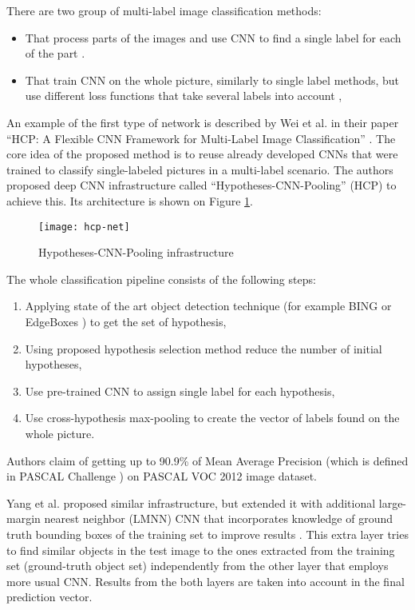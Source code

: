 There are two group of multi-label image classification methods:
\begin{itemize}
    \item That process parts of the images and use CNN to find a single label for each of the part \cite{Wei2016HCP, Yang2015, Ren2016}.
    \item That train CNN on the whole picture, similarly to single label methods, but use different loss functions that take several labels into account \cite{Gong2013DeepRanking},
\end{itemize}

An example of the first type of network is described by Wei et al. in their paper ``HCP: A Flexible CNN Framework for Multi-Label Image Classification''  \cite{Wei2016HCP}. The core idea of the proposed method is to reuse already developed CNNs that were trained to classify single-labeled pictures in a multi-label scenario. The authors proposed deep CNN infrastructure called ``Hypotheses-CNN-Pooling'' (HCP) to achieve this. Its architecture is shown on Figure \ref{fig:hcp-net}.

\begin{figure}[h!]
    \centering
    \texttt{[image: hcp-net]}
    \caption{Hypotheses-CNN-Pooling infrastructure \cite{Wei2016HCP}}
    \label{fig:hcp-net}
\end{figure}

The whole classification pipeline consists of the following steps:
\begin{enumerate}
    \item Applying state of the art object detection technique (for example BING \cite{Cheng2014} or EdgeBoxes \cite{Zitnick2014}) to get the set of hypothesis,
    \item Using proposed hypothesis selection method reduce the number of initial hypotheses,
    \item Use pre-trained CNN to assign single label for each hypothesis,
    \item Use cross-hypothesis max-pooling to create the vector of labels found on the whole picture.
\end{enumerate}

Authors claim of getting up to 90.9\% of Mean Average Precision (which is defined in PASCAL Challenge \cite{Everingham2010PASCAL-VOC}) on PASCAL VOC 2012 image dataset.

Yang et al. proposed similar infrastructure, but extended it with additional large-margin nearest neighbor (LMNN) CNN that incorporates knowledge of ground truth bounding boxes of the training set to improve results  \cite{Yang2015}. This extra layer tries to find similar objects in the test image to the ones extracted from the training set (ground-truth object set) independently from the other layer that employs more usual CNN. Results from the both layers are taken into account in the final prediction vector.


